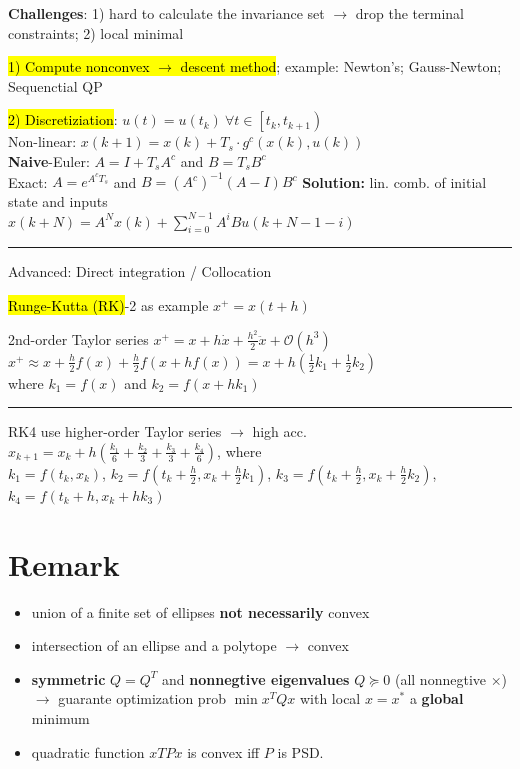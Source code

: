 \documentclass[10pt,a4paper,landscape]{article}
\newcommand{\quadRule}{\vspace{-3pt}\rule{0.23\textwidth}{0.4pt}}
\begin{document}
\begin{multicols*}{4}
\textbf{Challenges}: 1) hard to calculate the invariance set $\rightarrow$  drop the terminal constraints; 2) local minimal

\hl{1) Compute nonconvex $\rightarrow$ descent method}; 
example: Newton's; Gauss-Newton; Sequenctial QP

\hl{2) Discretiziation}: $u(t) = u(t_k) \: \forall t \in \left[ t_k, t_{k+1}\right) $\\
Non-linear: $x(k+1) = x(k) + T_s\cdot g^c(x(k),u(k))$\\
\textbf{Naive}-Euler: $A = I + T_sA^c$ and $B=T_sB^c$\\
Exact: $A=e^{A^c T_s}$ and $B = (A^c)^{-1}(A-I)B^c$
\textbf{Solution:} lin. comb. of initial state and inputs\\ $x(k+N) = A^N x(k) + \sum_{i=0}^{N-1} A^i B u(k+N-1-i)$

\quadRule

Advanced: Direct integration / Collocation

\hl{Runge-Kutta (RK)}-2 as example $x^+ = x(t+h)$

2nd-order Taylor series $x^{+}=x+h \dot{x}+\frac{h^{2}}{2} \ddot{x}+\mathcal{O}\left(h^{3}\right)$
$x^{+} \approx  x+\frac{h}{2} f(x)+\frac{h}{2} f(x+h f(x)) =  x+h\left(\frac{1}{2} k_{1}+\frac{1}{2} k_{2}\right)$ \\
where $k_{1}=f(x)$ and $k_{2}=f\left(x+h k_{1}\right)$

\quadRule

RK4 use higher-order Taylor series $\rightarrow$ high acc.
$
x_{k+1}=x_{k}+h\left(\frac{k_{1}}{6}+\frac{k_{2}}{3}+\frac{k_{3}}{3}+\frac{k_{4}}{6}\right)$, where \\
 $ k_{1}=f\left(t_{k}, x_{k}\right) $, 
$k_{2}=f\left(t_{k}+\frac{h}{2}, x_{k}+\frac{h}{2} k_{1}\right)$, 
$k_{3}=f(t_{k}+\frac{h}{2}, x_{k}+\tfrac{h}{2} k_{2})$, $k_{4}=f\left(t_{k}+h, x_{k}+h k_{3}\right)
$



\section{Remark}
\begin{itemize}
    \item union of a finite set of ellipses \textbf{not necessarily} convex
    \item intersection of an ellipse and a polytope $\rightarrow$ convex
    \item \textbf{symmetric} $Q=Q^T$ and \textbf{nonnegtive eigenvalues} $Q \succeq 0$ (all nonnegtive $\times$) $\rightarrow$ guarante optimization prob $\min x^TQx$ with local $x = x^*$ a \textbf{global} minimum
    \item quadratic function $xTPx$ is convex iff $P$ is PSD.
    

\end{itemize}
\end{multicols*}
\end{document}
